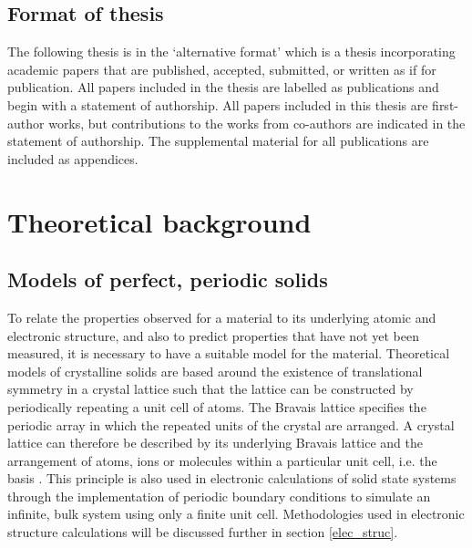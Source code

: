 \documentclass[11pt, twoside]{report}
\begin{document}
\section{Format of thesis}
The following thesis is in the `alternative format' which is a thesis incorporating academic papers that are published, accepted, submitted, or written as if for publication. All papers included in the thesis are labelled as publications and begin with a statement of authorship. All papers included in this thesis are first-author works, but contributions to the works from co-authors are indicated in the statement of authorship. The supplemental material for all publications are included as appendices.



\chapter{Theoretical background}                                                        

\section{Models of perfect, periodic solids}\label{crystal_models}
To relate the properties observed for a material to its underlying atomic and electronic structure, and also to predict properties that have not yet been measured, it is necessary to have a suitable model for the material. Theoretical models of crystalline solids are based around the existence of translational symmetry in a crystal lattice such that the lattice can be constructed by periodically repeating a unit cell of atoms. The Bravais lattice specifies the periodic array in which the repeated units of the crystal are arranged. A crystal lattice can therefore be described by its underlying Bravais lattice and the arrangement of atoms, ions or molecules within a particular unit cell, i.e. the basis \cite{AshcroftMermin2}. This principle is also used in electronic calculations of solid state systems through the implementation of periodic boundary conditions to simulate an infinite, bulk system using only a finite unit cell. Methodologies used in electronic structure calculations will be discussed further in section \ref{elec_struc}.
 
\end{document}
